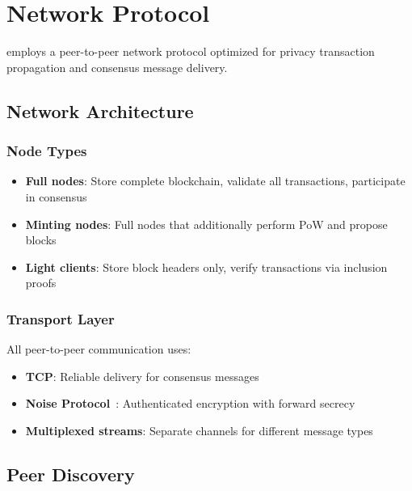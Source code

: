 
\section{Network Protocol}
\label{sec:network}

\Botho employs a peer-to-peer network protocol optimized for privacy
transaction propagation and consensus message delivery.

\subsection{Network Architecture}

\subsubsection{Node Types}

\begin{itemize}
  \item \textbf{Full nodes}: Store complete blockchain, validate all
    transactions, participate in consensus
  \item \textbf{Minting nodes}: Full nodes that additionally perform PoW
    and propose blocks
  \item \textbf{Light clients}: Store block headers only, verify
    transactions via inclusion proofs
\end{itemize}



\subsubsection{Transport Layer}

All peer-to-peer communication uses:
\begin{itemize}
  \item \textbf{TCP}: Reliable delivery for consensus messages
  \item \textbf{Noise Protocol}~\cite{noise}: Authenticated encryption
    with forward secrecy
  \item \textbf{Multiplexed streams}: Separate channels for different
    message types
\end{itemize}

\subsection{Peer Discovery}

